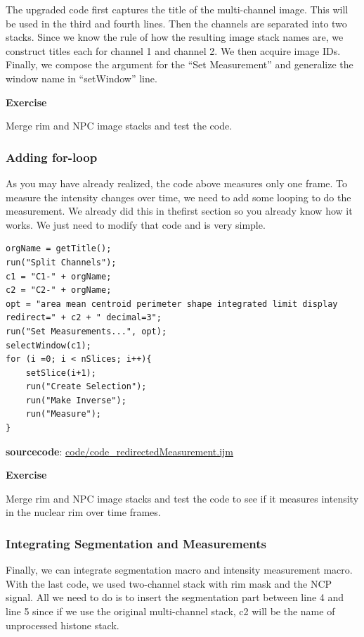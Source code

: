 \documentclass[11pt,a4paper,oneside]{report}
\newenvironment{indentexercise}[1]
{{\setlength{\leftmargin}{2em}}
\textbf{Exercise \thesubsection-#1}
\begin{list}{}
	\item
}
{\end{list}}
\begin{document}
The upgraded code first captures the title of the multi-channel image. This will be used in the third and fourth lines. Then the channels are separated into two stacks. Since we know the rule of how the resulting image stack names are, we construct titles each for channel 1 and channel 2. We then acquire image IDs. Finally,  we compose the argument for the ``Set Measurement'' and generalize the window name in ``setWindow'' line. 

\begin{indentexercise}{1}
Merge rim and NPC image stacks and test the code. 
\end{indentexercise}

\subsubsection{Adding for-loop}

As you may have already realized, the code above measures only one frame. To measure the intensity changes over time, we need to add some looping to do the measurement. We already did this in thefirst section so you already know how it works. We just need to modify that code and is very simple.


\begin{lstlisting}[morekeywords={*, for, nSlices, setSlice}]
orgName = getTitle();
run("Split Channels");
c1 = "C1-" + orgName;
c2 = "C2-" + orgName;
opt = "area mean centroid perimeter shape integrated limit display redirect=" + c2 + " decimal=3";
run("Set Measurements...", opt);
selectWindow(c1);
for (i =0; i < nSlices; i++){
	setSlice(i+1);
	run("Create Selection");
	run("Make Inverse");
	run("Measure");
}

\end{lstlisting}
\textbf{sourcecode}: \href{http://www.example.com/contents}{code/code\_redirectedMeasurement.ijm}

\begin{indentexercise}{2}
Merge rim and NPC image stacks and test the code to see if it measures intensity in the nuclear rim over time frames. 
\end{indentexercise}

\subsubsection{Integrating Segmentation and Measurements}

Finally, we can integrate segmentation macro and intensity measurement macro. With the last code, we used  two-channel stack with rim mask and the NCP signal. All we need to do is to insert the segmentation part between line 4 and line 5 since if we use the original multi-channel stack, c2 will be the name of unprocessed histone stack. 
\end{document}
